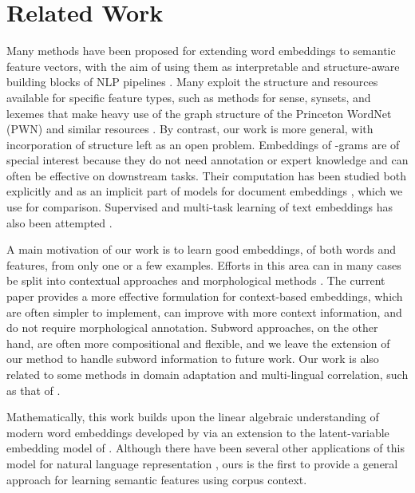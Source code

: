\documentclass[11pt,a4paper]{article}
\begin{document}
\section{Related Work}\label{sec:related}

Many methods have been proposed for extending word embeddings to semantic feature vectors, with the aim of using them as interpretable and structure-aware building blocks of NLP pipelines \cite{Kiros:15,Yamada:16}.
Many exploit the structure and resources available for specific feature types, such as methods for sense, synsets, and lexemes \cite{Rothe:15,Iacobacci:15} that make heavy use of the graph structure of the Princeton WordNet (PWN) and similar resources \cite{Fellbaum:98}.
By contrast, our work is more general, with incorporation of structure left as an open problem.
Embeddings of -grams are of special interest because they do not need annotation or expert knowledge and can often be effective on downstream tasks.
Their computation has been studied both explicitly \cite{Yin:14,Poliak:17} and as an implicit part of models for document embeddings \cite{Hill:16,Pagliardini:18}, which we use for comparison.
Supervised and multi-task learning of text embeddings has also been attempted \cite{Wang:17,Wu:17}.

A main motivation of our work is to learn good embeddings, of both words and features, from only one or a few examples.
Efforts in this area can in many cases be split into contextual approaches \cite{Lazaridou:17,Herbelot:17} and morphological methods \cite{Luong:13,Bojanowski:16,Pado:16}.
The current paper provides a more effective formulation for context-based embeddings, which are often simpler to implement, can improve with more context information, and do not require morphological annotation.
Subword approaches, on the other hand, are often more compositional and flexible, and we leave the extension of our method to handle subword information to future work. 
Our work is also related to some methods in domain adaptation and multi-lingual correlation, such as that of \citet{Bollegala:14}.

Mathematically, this work builds upon the linear algebraic understanding of modern word embeddings developed by \citet{Arora:18b} via an extension to the latent-variable embedding model of \citet{Arora:16}.
Although there have been several other applications of this model for natural language representation \cite{Arora:17,Mu:18}, ours is the first to provide a general approach for learning semantic features using corpus context. 
\end{document}
